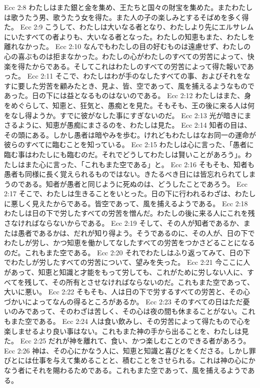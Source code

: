 Ecc 2:8  わたしはまた銀と金を集め、王たちと国々の財宝を集めた。またわたしは歌うたう男、歌うたう女を得た。また人の子の楽しみとするそばめを多く得た。
Ecc 2:9  こうして、わたしは大いなる者となり、わたしより先にエルサレムにいたすべての者よりも、大いなる者となった。わたしの知恵もまた、わたしを離れなかった。
Ecc 2:10  なんでもわたしの目の好むものは遠慮せず、わたしの心の喜ぶものは拒まなかった。わたしの心がわたしのすべての労苦によって、快楽を得たからである。そしてこれはわたしのすべての労苦によって得た報いであった。
Ecc 2:11  そこで、わたしはわが手のなしたすべての事、およびそれをなすに要した労苦を顧みたとき、見よ、皆、空であって、風を捕えるようなものであった。日の下には益となるものはないのである。
Ecc 2:12  わたしはまた、身をめぐらして、知恵と、狂気と、愚痴とを見た。そもそも、王の後に来る人は何をなし得ようか。すでに彼がなした事にすぎないのだ。
Ecc 2:13  光が暗きにまさるように、知恵が愚痴にまさるのを、わたしは見た。
Ecc 2:14  知者の目は、その頭にある。しかし愚者は暗やみを歩む。けれどもわたしはなお同一の運命が彼らのすべてに臨むことを知っている。
Ecc 2:15  わたしは心に言った、「愚者に臨む事はわたしにも臨むのだ。それでどうしてわたしは賢いことがあろう」。わたしはまた心に言った、「これもまた空である」と。
Ecc 2:16  そもそも、知者も愚者も同様に長く覚えられるものではない。きたるべき日には皆忘れられてしまうのである。知者が愚者と同じように死ぬのは、どうしたことであろう。
Ecc 2:17  そこで、わたしは生きることをいとった。日の下に行われるわざは、わたしに悪しく見えたからである。皆空であって、風を捕えるようである。
Ecc 2:18  わたしは日の下で労したすべての労苦を憎んだ。わたしの後に来る人にこれを残さなければならないからである。
Ecc 2:19  そして、その人が知者であるか、または愚者であるかは、だれが知り得よう。そうであるのに、その人が、日の下でわたしが労し、かつ知恵を働かしてなしたすべての労苦をつかさどることになるのだ。これもまた空である。
Ecc 2:20  それでわたしはふり返ってみて、日の下でわたしが労したすべての労苦について、望みを失った。
Ecc 2:21  今ここに人があって、知恵と知識と才能をもって労しても、これがために労しない人に、すべてを残して、その所有とさせなければならないのだ。これもまた空であって、大いに悪い。
Ecc 2:22  そもそも、人は日の下で労するすべての労苦と、その心づかいによってなんの得るところがあるか。
Ecc 2:23  そのすべての日はただ憂いのみであって、そのわざは苦しく、その心は夜の間も休まることがない。これもまた空である。
Ecc 2:24  人は食い飲みし、その労苦によって得たもので心を楽しませるより良い事はない。これもまた神の手から出ることを、わたしは見た。
Ecc 2:25  だれが神を離れて、食い、かつ楽しむことのできる者があろう。
Ecc 2:26  神は、その心にかなう人に、知恵と知識と喜びとをくださる。しかし罪びとには仕事を与えて集めることと、積むことをさせられる。これは神の心にかなう者にそれを賜わるためである。これもまた空であって、風を捕えるようである。
